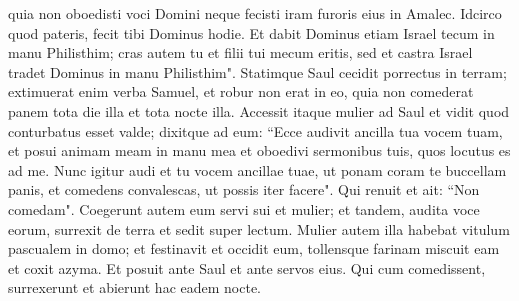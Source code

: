 \begin{biblechapter}
\verse quia non oboedisti voci Domini neque fecisti iram furoris eius in Amalec. Idcirco quod pateris, fecit tibi Dominus hodie. 
\verse Et dabit Dominus etiam Israel tecum in manu Philisthim; cras autem tu et filii tui mecum eritis, sed et castra Israel tradet Dominus in manu Philisthim". 
\verse Statimque Saul cecidit porrectus in terram; extimuerat enim verba Samuel, et robur non erat in eo, quia non comederat panem tota die illa et tota nocte illa. 
\verse Accessit itaque mulier ad Saul et vidit quod conturbatus esset valde; dixitque ad eum: “Ecce audivit ancilla tua vocem tuam, et posui animam meam in manu mea et oboedivi sermonibus tuis, quos locutus es ad me. 
\verse Nunc igitur audi et tu vocem ancillae tuae, ut ponam coram te buccellam panis, et comedens convalescas, ut possis iter facere". 
\verse Qui renuit et ait: “Non comedam". Coegerunt autem eum servi sui et mulier; et tandem, audita voce eorum, surrexit de terra et sedit super lectum. 
\verse Mulier autem illa habebat vitulum pascualem in domo; et festinavit et occidit eum, tollensque farinam miscuit eam et coxit azyma. 
\verse Et posuit ante Saul et ante servos eius. Qui cum comedissent, surrexerunt et abierunt hac eadem nocte. 
\end{biblechapter}

